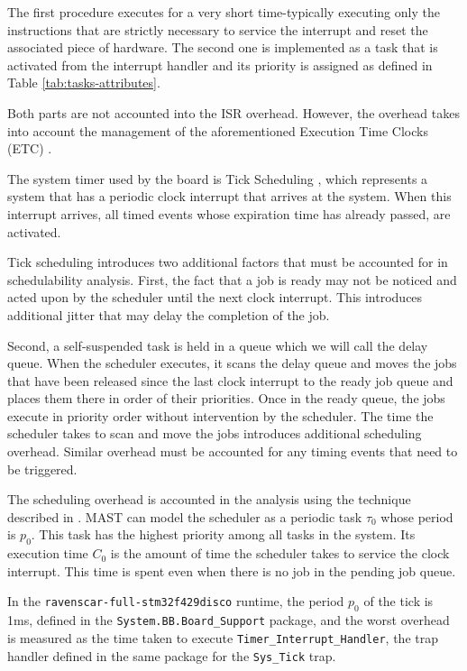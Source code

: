 \documentclass{article}
\begin{document}
The first procedure executes for a very short time-typically executing only the instructions that are strictly necessary to service the interrupt and reset the associated piece of hardware. The second one is implemented as a task that is activated from the interrupt handler and its priority is assigned as defined in Table \ref{tab:tasks-attributes}.

Both parts are not accounted into the ISR overhead. However, the overhead takes into account the management of the aforementioned Execution Time Clocks (ETC) \cite{etc}.

The system timer used by the board is Tick Scheduling \cite{tick-scheduling}, which represents a system that has a periodic clock interrupt that arrives at the system. When this interrupt arrives, all timed events whose expiration time has already passed, are activated.

Tick scheduling introduces two additional factors that must be accounted for in schedulability analysis. First, the fact that a job is ready may not be noticed and acted upon by the scheduler until the next clock interrupt. This introduces additional jitter that may delay the completion of the job.

Second, a self-suspended task is held in a queue which we will call the delay queue. When the scheduler executes, it scans the delay queue and moves the jobs that have been released since the last clock interrupt to the ready job queue and places them there in order of their priorities. Once in the ready queue, the jobs execute in priority order without intervention by the scheduler. The time the scheduler takes to scan and move the jobs introduces additional scheduling overhead. Similar overhead must be accounted for any timing events that need to be triggered.

The scheduling overhead is accounted in the analysis using the technique described in \cite{effects-runtime}. MAST can model the scheduler as a periodic task $\tau_0$ whose period is $p_0$. This task has the highest priority among all tasks in the system. Its execution time $C_0$ is the amount of time the scheduler takes to service the clock interrupt. This time is spent even when there is no job in the pending job queue.

In the \texttt{ravenscar-full-stm32f429disco} runtime, the period $p_0$ of the tick is 1ms, defined in the \texttt{System.BB.Board\_Support} package, and the worst overhead is measured as the time taken to execute \texttt{Timer\_Interrupt\_Handler}, the trap handler defined in the same package for the \texttt{Sys\_Tick} trap.
\end{document}
